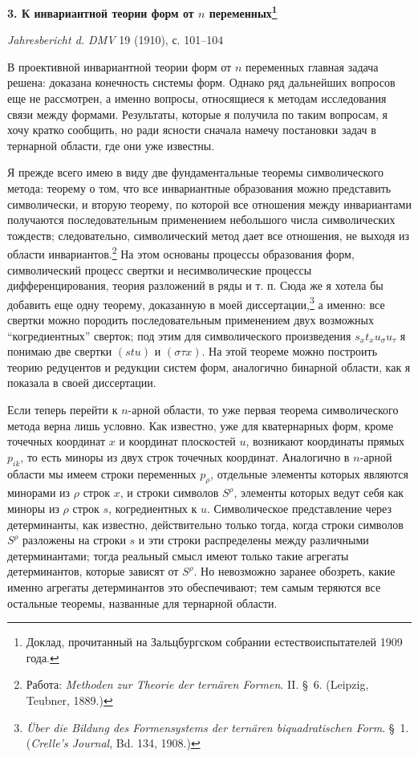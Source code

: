 \documentclass[11pt]{article}
\begin{document}
\begin{center}
{\Large\bfseries 3. К инвариантной теории форм от $n$ переменных\footnote{Доклад, прочитанный на Зальцбургском собрании естествоиспытателей 1909 года.}}\par
\vspace{1.2em}
\emph{Jahresbericht d. DMV} 19 (1910), с. 101--104
\end{center}

\vspace{1em}
В проективной инвариантной теории форм от $n$ переменных главная задача решена: доказана конечность системы форм. Однако ряд дальнейших вопросов еще не рассмотрен, а именно вопросы, относящиеся к методам исследования связи между формами. Результаты, которые я получила по таким вопросам, я хочу кратко сообщить, но ради ясности сначала намечу постановки задач в тернарной области, где они уже известны.

Я прежде всего имею в виду две фундаментальные теоремы символического метода: теорему о том, что все инвариантные образования можно представить символически, и вторую теорему, по которой все отношения между инвариантами получаются последовательным применением небольшого числа символических тождеств; следовательно, символический метод дает все отношения, не выходя из области инвариантов.\footnote{Работа: \emph{Methoden zur Theorie der ternären Formen}. II. \S\ 6. (Leipzig, Teubner, 1889.)} На этом основаны процессы образования форм, символический процесс свертки и несимволические процессы дифференцирования, теория разложений в ряды и т. п. Сюда же я хотела бы добавить еще одну теорему, доказанную в моей диссертации,\footnote{\emph{Über die Bildung des Formensystems der ternären biquadratischen Form}. \S\ 1. (\emph{Crelle's Journal}, Bd. 134, 1908.)} а именно: все свертки можно породить последовательным применением двух возможных ``когредиентных'' сверток; под этим для символического произведения $s_x t_x u_\sigma u_\tau$ я понимаю две свертки $(stu)$ и $(\sigma\tau x)$. На этой теореме можно построить теорию редуцентов и редукции систем форм, аналогично бинарной области, как я показала в своей диссертации.

Если теперь перейти к $n$-арной области, то уже первая теорема символического метода верна лишь условно. Как известно, уже для кватернарных форм, кроме точечных координат $x$ и координат плоскостей $u$, возникают координаты прямых $p_{ik}$, то есть миноры из двух строк точечных координат. Аналогично в $n$-арной области мы имеем строки переменных $p_\rho$, отдельные элементы которых являются минорами из $\rho$ строк $x$, и строки символов $S^\rho$, элементы которых ведут себя как миноры из $\rho$ строк $s$, когредиентных к $u$. Символическое представление через детерминанты, как известно, действительно только тогда, когда строки символов $S^\rho$ разложены на строки $s$ и эти строки распределены между различными детерминантами; тогда реальный смысл имеют только такие агрегаты детерминантов, которые зависят от $S^\rho$. Но невозможно заранее обозреть, какие именно агрегаты детерминантов это обеспечивают; тем самым теряются все остальные теоремы, названные для тернарной области.
\end{document}
